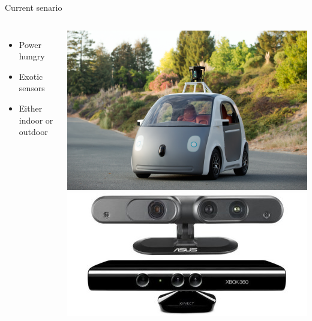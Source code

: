 \documentclass[17pt,mathserif]{beamer}
\begin{document}
    \begin{frame}{Current senario} %
      \vspace*{-3em}        
      \begin{columns}[c] %
          \begin{itemize}
            \item Power hungry
            \item Exotic sensors
            \item Either indoor or outdoor
          \end{itemize}
        \hspace*{-3em}
        \includegraphics[width=1.5\textwidth]{Google_Self-Driving_Prototype__1_}\\[1em]
        \hspace*{-2em}
        \includegraphics[width=1.2\textwidth]{kin}
      \end{columns}
    \end{frame}
    
\end{document}
